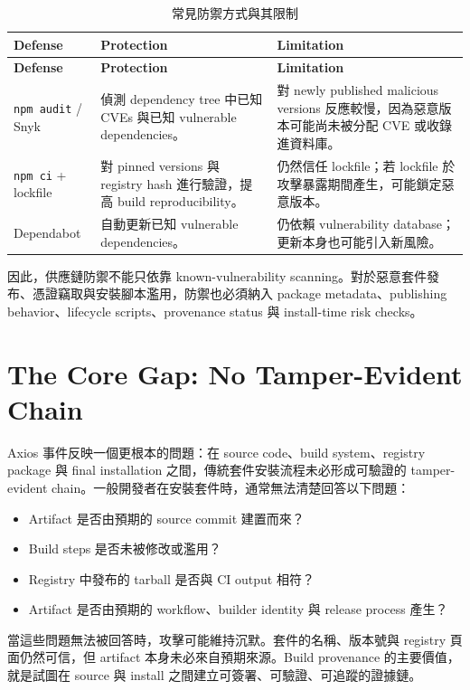 \documentclass[12pt,a4paper]{article}
\begin{document}
\begin{longtable}{P{3.3cm}P{5.2cm}P{6.1cm}}
\caption{常見防禦方式與其限制}\\
\toprule
\textbf{Defense} & \textbf{Protection} & \textbf{Limitation} \\
\midrule
\endfirsthead
\toprule
\textbf{Defense} & \textbf{Protection} & \textbf{Limitation} \\
\midrule
\endhead
\texttt{npm audit} / Snyk & 偵測 dependency tree 中已知 CVEs 與已知 vulnerable dependencies。 & 對 newly published malicious versions 反應較慢，因為惡意版本可能尚未被分配 CVE 或收錄進資料庫。 \\
\addlinespace
\texttt{npm ci} + lockfile & 對 pinned versions 與 registry hash 進行驗證，提高 build reproducibility。 & 仍然信任 lockfile；若 lockfile 於攻擊暴露期間產生，可能鎖定惡意版本。 \\
\addlinespace
Dependabot & 自動更新已知 vulnerable dependencies。 & 仍依賴 vulnerability database；更新本身也可能引入新風險。 \\
\bottomrule
\end{longtable}

因此，供應鏈防禦不能只依靠 known-vulnerability scanning。對於惡意套件發布、憑證竊取與安裝腳本濫用，防禦也必須納入 package metadata、publishing behavior、lifecycle scripts、provenance status 與 install-time risk checks。

\section{The Core Gap: No Tamper-Evident Chain}

Axios 事件反映一個更根本的問題：在 source code、build system、registry package 與 final installation 之間，傳統套件安裝流程未必形成可驗證的 tamper-evident chain。一般開發者在安裝套件時，通常無法清楚回答以下問題：

\begin{itemize}
  \item Artifact 是否由預期的 source commit 建置而來？
  \item Build steps 是否未被修改或濫用？
  \item Registry 中發布的 tarball 是否與 CI output 相符？
  \item Artifact 是否由預期的 workflow、builder identity 與 release process 產生？
\end{itemize}

當這些問題無法被回答時，攻擊可能維持沉默。套件的名稱、版本號與 registry 頁面仍然可信，但 artifact 本身未必來自預期來源。Build provenance 的主要價值，就是試圖在 source 與 install 之間建立可簽署、可驗證、可追蹤的證據鏈。
\end{document}
